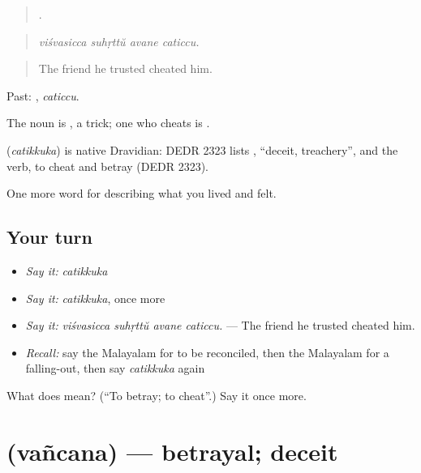 \begin{quote}
   .
\end{quote}

\begin{quote}
\emph{viśvasicca suhṛttŭ avane caticcu.}
\end{quote}

\begin{quote}
The friend he trusted cheated him.
\end{quote}

Past: , \emph{caticcu}.

The noun is , a trick; one who cheats is .

\begin{cousinweb}
\textbf{} (\emph{catikkuka}) is native Dravidian: DEDR 2323 lists , \textquotedblleft{}deceit, treachery\textquotedblright{}, and the verb, to cheat and betray (DEDR 2323).
\end{cousinweb}

\begin{grammarlens}[title={What you've built}]
One more word for describing what you lived and felt.
\end{grammarlens}

\subsection*{Your turn}
\begin{itemize}
\raggedright
  \item \emph{Say it:} \emph{catikkuka}
  \item \emph{Say it:} \emph{catikkuka}, once more
  \item \emph{Say it:} \emph{viśvasicca suhṛttŭ avane caticcu.} — The friend he trusted cheated him.
  \item \emph{Recall:} say the Malayalam for to be reconciled, then the Malayalam for a falling-out, then say \emph{catikkuka} again
\end{itemize}

\begin{tcolorbox}[breakable,colback=teal!4,colframe=teal!35!black,title={Before you move on}]
What does  mean? (\textquotedblleft{}To betray; to cheat\textquotedblright{}.) Say it once more.
\end{tcolorbox}
\section[\texorpdfstring{\ml{വഞ്ചന} (vañcana)}{വഞ്ചന (vañcana)}]{ (vañcana) — betrayal; deceit}

